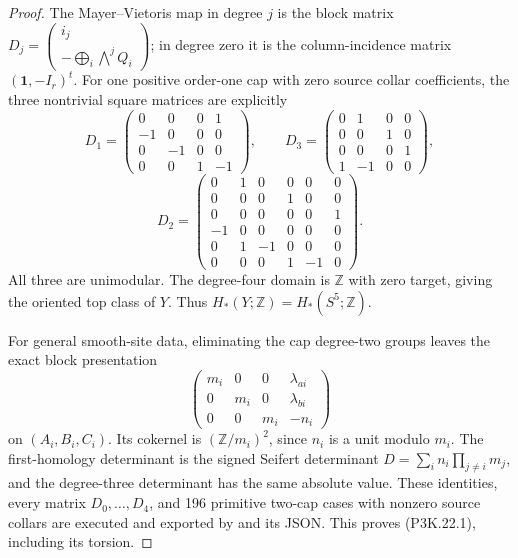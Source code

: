 \begin{proof}
The Mayer--Vietoris map in degree \(j\) is the block matrix
\(D_j=\begin{pmatrix}i_j\\-\bigoplus_i\bigwedge^jQ_i\end{pmatrix}\); in degree zero it
is the column-incidence matrix \((\mathbf1,-I_r)^t\).
For one positive order-one cap with zero source collar coefficients,
the three nontrivial square matrices are explicitly
\[
 D_1=\begin{pmatrix}
 0&0&0&1\\-1&0&0&0\\0&-1&0&0\\0&0&1&-1
 \end{pmatrix},\qquad
 D_3=\begin{pmatrix}
 0&1&0&0\\0&0&1&0\\0&0&0&1\\1&-1&0&0
 \end{pmatrix},
\]
\[
 D_2=\begin{pmatrix}
 0&1&0&0&0&0\\0&0&0&1&0&0\\0&0&0&0&0&1\\
 -1&0&0&0&0&0\\0&1&-1&0&0&0\\0&0&0&1&-1&0
 \end{pmatrix}.
\]
All three are unimodular.  The degree-four domain is \(\mathbb Z\)
with zero target, giving the oriented top class of \(Y\).  Thus
\(H_*(Y;\mathbb Z)=H_*(S^5;\mathbb Z)\).

For general smooth-site data, eliminating the cap degree-two groups
leaves the exact block presentation
\[
 \begin{pmatrix}
 m_i&0&0&\lambda_{ai}\\
 0&m_i&0&\lambda_{bi}\\
 0&0&m_i&-n_i
 \end{pmatrix}                                                   \tag{P3K.22.7}
\]
on \((A_i,B_i,C_i)\).  Its cokernel is
\((\mathbb Z/m_i)^2\), since \(n_i\) is a unit modulo \(m_i\).
The first-homology determinant is the signed Seifert determinant
\(D=\sum_i n_i\prod_{j\ne i}m_j\), and the degree-three
determinant has the same absolute value.  These identities, every
matrix \(D_0,\ldots,D_4\), and 196 primitive two-cap cases with
nonzero source collars are executed and exported by
 and its JSON.
This proves (P3K.22.1), including its torsion.


\end{proof}
